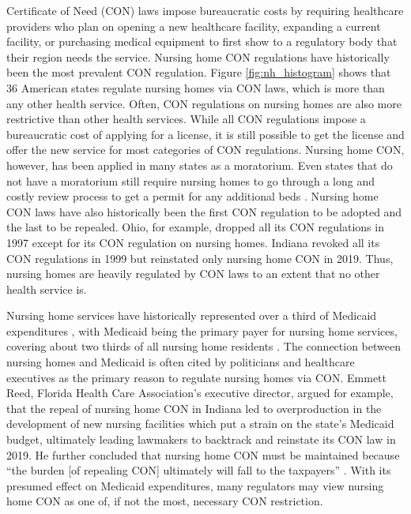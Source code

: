 \documentclass[../Main.tex]{subfiles}
\begin{document}
Certificate of Need (CON) laws impose bureaucratic costs by requiring healthcare providers who plan on opening a new healthcare facility, expanding a current facility, or purchasing medical equipment to first show to a regulatory body that their region needs the service. Nursing home CON regulations have historically been the most prevalent CON regulation. Figure \ref{fig:nh_histogram} shows that 36 American states regulate nursing homes via CON laws, which is more than any other health service. Often, CON regulations on nursing homes are also more restrictive than other health services. While all CON regulations impose a bureaucratic cost of applying for a license, it is still possible to get the license and offer the new service for most categories of CON regulations. Nursing home CON, however, has been applied in many states as a moratorium. Even states that do not have a moratorium still require nursing homes to go through a long and costly review process to get a permit for any additional beds \citep{american2020american}. Nursing home CON laws have also historically been the first CON regulation to be adopted and the last to be repealed. Ohio, for example, dropped all its CON regulations in 1997 except for its CON regulation on nursing homes. Indiana revoked all its CON regulations in 1999 but reinstated only nursing home CON in 2019. Thus, nursing homes are heavily regulated by CON laws to an extent that no other health service is. 
 

Nursing home services have historically represented over a third of Medicaid expenditures \citep{wiener1999controlling}, with Medicaid being the primary payer for nursing home services, covering about two thirds of all nursing home residents . The connection between nursing homes and Medicaid is often cited by politicians and healthcare executives as the primary reason to regulate nursing homes via CON. Emmett Reed, Florida Health Care Association’s executive director, argued for example, that the repeal of nursing home CON in Indiana led to overproduction in the development of new nursing facilities which put a strain on the state’s Medicaid budget, ultimately leading lawmakers to backtrack and reinstate its CON law in 2019. He further concluded that nursing home CON must be maintained because “the burden [of repealing CON] ultimately will fall to the taxpayers” \citep{sexton2019conrepeal}. With its presumed effect on Medicaid expenditures, many regulators may view nursing home CON as one of, if not the most, necessary CON restriction.
\end{document}
